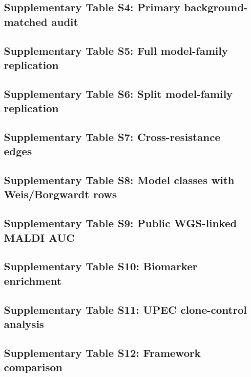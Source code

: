 \documentclass[11pt]{article}
\begin{document}
\subsection*{Supplementary Table S4: Primary background-matched audit}


\subsection*{Supplementary Table S5: Full model-family replication}


\subsection*{Supplementary Table S6: Split model-family replication}


\subsection*{Supplementary Table S7: Cross-resistance edges}


\subsection*{Supplementary Table S8: Model classes with Weis/Borgwardt rows}


\subsection*{Supplementary Table S9: Public WGS-linked MALDI AUC}


\subsection*{Supplementary Table S10: Biomarker enrichment}


\subsection*{Supplementary Table S11: UPEC clone-control analysis}


\subsection*{Supplementary Table S12: Framework comparison}

\end{document}
